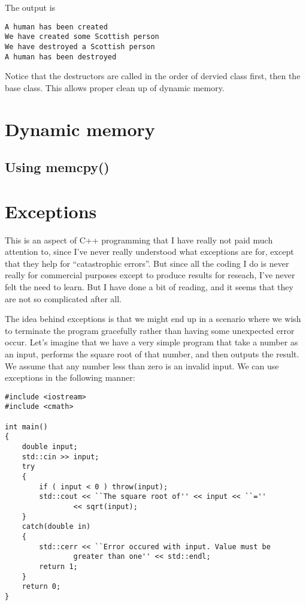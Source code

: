 The output is
\begin{verbatim}
A human has been created
We have created some Scottish person
We have destroyed a Scottish person
A human has been destroyed
\end{verbatim}
Notice that the destructors are called in the order of dervied class first, then the base class. This allows proper clean up of dynamic memory.

\section{Dynamic memory}

\subsection{Using memcpy()}

\section{Exceptions}
\label{sec:exceptions}

This is an aspect of C++ programming that I have really not paid much
attention to, since I've never really understood what exceptions are
for, except that they help for ``catastrophic errors''. But since all
the coding I do is never really for commercial purposes except to
produce results for reseach, I've never felt the need to learn. But I
have done a bit of reading, and it seems that they are not so
complicated after all. 

The idea behind exceptions is that we might end up in a scenario where
we wish to terminate the program gracefully rather than having some
unexpected error occur. Let's imagine that we have a very simple
program that take a number as an input, performs the square root of
that number, and then outputs the result. We assume that any number
less than zero is an invalid input. We can use exceptions in the
following manner:
\begin{lstlisting}
#include <iostream>
#include <cmath>

int main()
{
	double input;
	std::cin >> input;
	try
	{
		if ( input < 0 ) throw(input);
		std::cout << ``The square root of'' << input << ``=''
                << sqrt(input);
	}
	catch(double in)
	{
		std::cerr << ``Error occured with input. Value must be
                greater than one'' << std::endl;
		return 1;
	}
	return 0;
}
\end{lstlisting}

